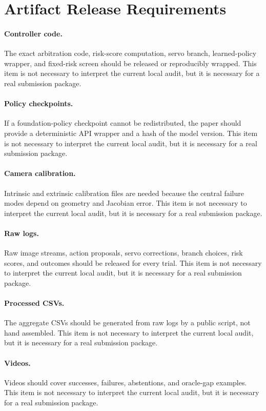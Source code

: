 \documentclass{article}
\begin{document}
\section{Artifact Release Requirements}
\paragraph{Controller code.} The exact arbitration code, risk-score computation, servo branch, learned-policy wrapper, and fixed-risk screen should be released or reproducibly wrapped. This item is not necessary to interpret the current local audit, but it is necessary for a real submission package.
\paragraph{Policy checkpoints.} If a foundation-policy checkpoint cannot be redistributed, the paper should provide a deterministic API wrapper and a hash of the model version. This item is not necessary to interpret the current local audit, but it is necessary for a real submission package.
\paragraph{Camera calibration.} Intrinsic and extrinsic calibration files are needed because the central failure modes depend on geometry and Jacobian error. This item is not necessary to interpret the current local audit, but it is necessary for a real submission package.
\paragraph{Raw logs.} Raw image streams, action proposals, servo corrections, branch choices, risk scores, and outcomes should be released for every trial. This item is not necessary to interpret the current local audit, but it is necessary for a real submission package.
\paragraph{Processed CSVs.} The aggregate CSVs should be generated from raw logs by a public script, not hand assembled. This item is not necessary to interpret the current local audit, but it is necessary for a real submission package.
\paragraph{Videos.} Videos should cover successes, failures, abstentions, and oracle-gap examples. This item is not necessary to interpret the current local audit, but it is necessary for a real submission package.
\end{document}
